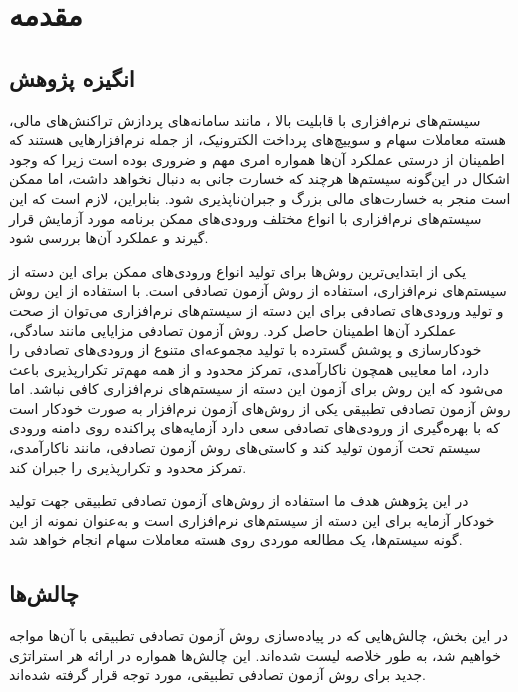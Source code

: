 
\chapter{مقدمه}\label{chapter1}

\section{انگیزه پژوهش}
سیستم‌های نرم‌افزاری با قابلیت بالا \cite{dyson2004architecting}، مانند سامانه‌های پردازش تراکنش‌های مالی، هسته معاملات سهام و سوییچ‌های پرداخت الکترونیک، از جمله نرم‌افزارهایی هستند که اطمینان از درستی عملکرد آن‌ها همواره امری مهم و ضروری بوده است زیرا که وجود اشکال در این‌گونه سیستم‌ها هرچند که خسارت جانی به دنبال نخواهد داشت، اما ممکن است منجر به خسارت‌های مالی بزرگ و جبران‌ناپذیری شود.  بنابراین، لازم است که این سیستم‌های نرم‌افزاری با انواع مختلف ورودی‌های ممکن برنامه مورد آزمایش قرار گیرند و عملکرد آن‌ها بررسی شود.

 یکی از ابتدایی‌ترین روش‌ها برای تولید انواع ورودی‌های ممکن برای این دسته از سیستم‌های نرم‌افزاری، استفاده از روش آزمون تصادفی
 \cite{hamlet1994random}
 است. با استفاده از این روش و تولید ورودی‌های تصادفی برای این دسته از سیستم‌های نرم‌افزاری می‌توان از صحت عملکرد آن‌ها اطمینان حاصل کرد. روش آزمون تصادفی مزایایی مانند سادگی، خودکارسازی و پوشش گسترده با تولید مجموعه‌ای متنوع از ورودی‌های تصادفی را دارد، اما معایبی همچون ناکارآمدی، تمرکز محدود و از همه مهم‌تر تکرارپذیری باعث می‌شود که این روش برای آزمون این دسته از سیستم‌های نرم‌افزاری کافی نباشد.
اما روش آزمون تصادفی تطبیقی
\cite{huang2019survey}
 یکی از روش‌های آزمون نرم‌افزار به صورت خودکار است که با بهره‌گیری از ورودی‌های تصادفی سعی دارد آزمایه‌های پراکنده روی دامنه ورودی سیستم تحت آزمون تولید کند و کاستی‌های روش آزمون تصادفی، مانند ناکارآمدی، تمرکز محدود و تکرارپذیری را جبران کند.

در این پژوهش هدف ما استفاده از روش‌های آزمون تصادفی تطبیقی جهت تولید خودکار آزمایه برای این دسته از سیستم‌های نرم‌افزاری است و به‌عنوان نمونه از این گونه سیستم‌ها، یک مطالعه موردی روی هسته معاملات سهام انجام خواهد شد.

\section{چالش‌ها}

در این بخش، چالش‌هایی که در پیاده‌سازی روش آزمون تصادفی تطبیقی با آن‌ها مواجه خواهیم شد، به طور خلاصه لیست شده‌اند. این چالش‌ها همواره در ارائه هر استراتژی جدید برای روش آزمون تصادفی تطبیقی، مورد توجه قرار گرفته شده‌اند.

